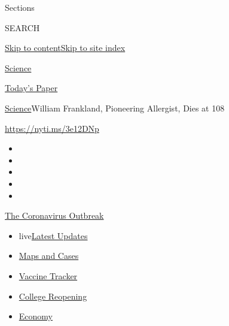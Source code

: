 Sections

SEARCH

\protect\hyperlink{site-content}{Skip to
content}\protect\hyperlink{site-index}{Skip to site index}

\href{https://www.nytimes.com/section/science}{Science}

\href{https://myaccount.nytimes.com/auth/login?response_type=cookie\&client_id=vi}{}

\href{https://www.nytimes.com/section/todayspaper}{Today's Paper}

\href{/section/science}{Science}\textbar{}William Frankland, Pioneering
Allergist, Dies at 108

\url{https://nyti.ms/3e12DNp}

\begin{itemize}
\item
\item
\item
\item
\item
\end{itemize}

\href{https://www.nytimes.com/news-event/coronavirus?action=click\&pgtype=Article\&state=default\&region=TOP_BANNER\&context=storylines_menu}{The
Coronavirus Outbreak}

\begin{itemize}
\tightlist
\item
  live\href{https://www.nytimes.com/2020/08/03/world/coronavirus-covid-19.html?action=click\&pgtype=Article\&state=default\&region=TOP_BANNER\&context=storylines_menu}{Latest
  Updates}
\item
  \href{https://www.nytimes.com/interactive/2020/us/coronavirus-us-cases.html?action=click\&pgtype=Article\&state=default\&region=TOP_BANNER\&context=storylines_menu}{Maps
  and Cases}
\item
  \href{https://www.nytimes.com/interactive/2020/science/coronavirus-vaccine-tracker.html?action=click\&pgtype=Article\&state=default\&region=TOP_BANNER\&context=storylines_menu}{Vaccine
  Tracker}
\item
  \href{https://www.nytimes.com/2020/08/02/us/covid-college-reopening.html?action=click\&pgtype=Article\&state=default\&region=TOP_BANNER\&context=storylines_menu}{College
  Reopening}
\item
  \href{https://www.nytimes.com/live/2020/08/03/business/stock-market-today-coronavirus?action=click\&pgtype=Article\&state=default\&region=TOP_BANNER\&context=storylines_menu}{Economy}
\end{itemize}

